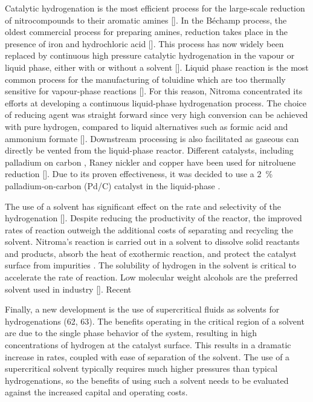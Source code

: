 Catalytic hydrogenation is the most efficient process for the large-scale reduction of nitrocompounds to their aromatic amines []. In the Béchamp process, the oldest commercial process for preparing amines, reduction takes place in the presence of iron and hydrochloric acid []. This process has now widely been replaced by continuous high pressure catalytic hydrogenation in the vapour or liquid phase, either with or without a solvent []. Liquid phase reaction is the most common process for the manufacturing of toluidine which are too thermally sensitive for vapour-phase reactions []. For this reason, Nitroma concentrated its efforts at developing a continuous liquid-phase hydrogenation process. The choice of reducing agent was straight forward since very high conversion can be achieved with pure hydrogen, compared to liquid alternatives such as formic acid and ammonium formate []. Downstream processing is also facilitated as gaseous  can directly be vented from the liquid-phase reactor. Different catalysts, including palladium on carbon , Raney nickler and copper have been used for nitroluene reduction []. Due to its proven effectiveness, it was decided to use a \SI{2}{\percent\ww} palladium-on-carbon (Pd/C) catalyst in the liquid-phase \cite{rajadhyaksha_solvent_1986}. 

The use of a solvent has significant effect on the rate and selectivity of the hydrogenation []. Despite reducing the productivity of the reactor, the improved rates of reaction outweigh the additional costs of separating and recycling the solvent. Nitroma's reaction is carried out in a solvent to dissolve solid reactants and products, absorb the heat of exothermic reaction, and protect the catalyst surface from impurities \cite{yao_kinetics_1959}. The solubility of hydrogen in the solvent is critical to accelerate the rate of reaction. Low molecular weight alcohols are the preferred solvent used in industry []. Recent 


Finally, a new development is the use of supercritical fluids as solvents for hydrogenations (62, 63). The benefits operating in the critical region of a solvent are due to the single phase behavior of the system, resulting in high concentrations of hydrogen at the catalyst surface. This results in a dramatic increase in rates, coupled with ease of separation of the solvent. 
The use of a supercritical solvent typically requires much higher pressures than typical hydrogenations, so the benefits of using such a solvent needs to be evaluated against the increased capital and operating costs. 




